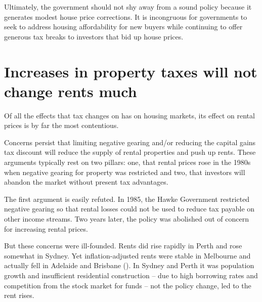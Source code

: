 \documentclass{grattan}\usepackage[]{graphicx}\usepackage[]{color}
\begin{document}
Ultimately, the government should not shy away from a sound policy because it generates modest house price corrections. It is incongruous for governments to seek to address housing affordability for new buyers while continuing to offer generous tax breaks to investors that bid up house prices.  

\section{Increases in property taxes will not change rents much}\label{sec:taxes-not-change-rents-much}











Of all the effects that tax changes on  has on housing markets, its effect on rental prices is by far the most contentious.

Concerns persist that limiting negative gearing and/or reducing the capital gains tax discount will reduce the supply of rental properties and push up rents. These arguments typically rest on two pillars: one, that rental prices rose in the 1980s when negative gearing for property was restricted and two, that investors will abandon the market without present tax advantages. 

The first argument is easily refuted. In 1985, the Hawke Government restricted negative gearing so that rental losses could not be used to reduce tax payable on other income streams.  Two years later, the policy was abolished out of concern for increasing rental prices. 

But these concerns were ill-founded. Rents did rise rapidly in Perth and rose somewhat in Sydney. Yet inflation-adjusted rents were stable in Melbourne and actually fell in Adelaide and Brisbane (). In Sydney and Perth it was population growth and insufficient residential construction -- due to high borrowing rates and competition from the stock market for funds -- not the policy change, led to the rent rises. 
\end{document}

